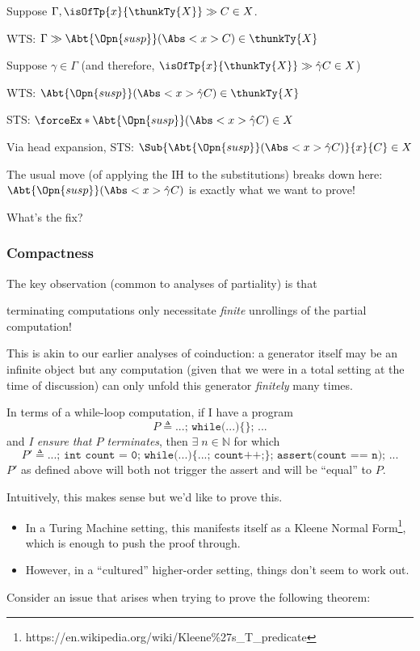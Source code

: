 \documentclass[letterpaper]{article}
\newcommand{\rSuspEx}[2]{\Abt{\Opn{susp}}(\Abs<#1>{#2})}
\begin{document}
Suppose $\Gamma, \isOfTp{x}{\thunkTy{X}} \gg C \in X$.

WTS: $\Gamma \gg \rSuspEx{x}{C} \in \thunkTy{X}$

Suppose $\gamma \in \Gamma$ (and therefore, $\isOfTp{x}{\thunkTy{X}} \gg \hat{\gamma}C \in X$)

WTS: $\rSuspEx{x}{\hat{\gamma}C} \in \thunkTy{X}$

STS: $\forceEx*{\rSuspEx{x}{\hat{\gamma}C}} \in X$

Via head expansion, STS: $\Sub{\rSuspEx{x}{\hat{\gamma}C}}{x}{C} \in X$

The usual move (of applying the IH to the substitutions) breaks down here: $\rSuspEx{x}{\hat{\gamma}C}$ is exactly what we want to prove!

What's the fix?

\subsubsection{Compactness}

The key observation (common to analyses of partiality) is that
\begin{center}
terminating computations only necessitate \textit{finite} unrollings of the partial computation!
\end{center}

This is akin to our earlier analyses of coinduction: a generator itself may be an infinite object but any computation (given that we were in a total setting at the time of discussion) can only unfold this generator \textit{finitely} many times.

In terms of a while-loop computation, if I have a program 
\[
P \triangleq \texttt{...; while(...)\{\}; ...}
\]
and \textit{I ensure that $P$ terminates}, then $\exists \; n \in \mathbb{N}$ for which
\[
P' \triangleq \texttt{...; int count = 0; while(...)\{...; count++;\}; assert(count == n); ...}
\]
$P'$ as defined above will both not trigger the assert and will be ``equal'' to $P$.

Intuitively, this makes sense but we'd like to prove this.

\begin{itemize}
    \item In a Turing Machine setting, this manifests itself as a Kleene Normal Form\footnote{https://en.wikipedia.org/wiki/Kleene\%27s\_T\_predicate}, which is enough to push the proof through.
    \item However, in a ``cultured'' higher-order setting, things don't seem to work out.
\end{itemize}
Consider an issue that arises when trying to prove the following theorem:
\end{document}
